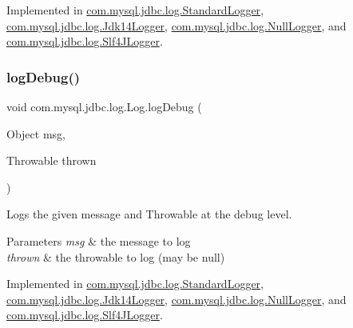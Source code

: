 Implemented in \mbox{\hyperlink{classcom_1_1mysql_1_1jdbc_1_1log_1_1_standard_logger_a3b3bd15eb1f92d224a747ef52620cfdf}{com.\+mysql.\+jdbc.\+log.\+Standard\+Logger}}, \mbox{\hyperlink{classcom_1_1mysql_1_1jdbc_1_1log_1_1_jdk14_logger_a0eacb4fd20d546869f80b5ecd9e8998c}{com.\+mysql.\+jdbc.\+log.\+Jdk14\+Logger}}, \mbox{\hyperlink{classcom_1_1mysql_1_1jdbc_1_1log_1_1_null_logger_a947d1f20badd221aa5aaf15a5944dd56}{com.\+mysql.\+jdbc.\+log.\+Null\+Logger}}, and \mbox{\hyperlink{classcom_1_1mysql_1_1jdbc_1_1log_1_1_slf4_j_logger_a14878bdfd16f163e96847e3d54a4fa5a}{com.\+mysql.\+jdbc.\+log.\+Slf4\+J\+Logger}}.

\mbox{\label{interfacecom_1_1mysql_1_1jdbc_1_1log_1_1_log_ae11c12bcf67d9681ab03e97b9098d28d}} 
\subsubsection{\texorpdfstring{log\+Debug()}{logDebug()}\hspace{0.1cm}{\footnotesize\ttfamily [2/2]}}
{\footnotesize\ttfamily void com.\+mysql.\+jdbc.\+log.\+Log.\+log\+Debug (\begin{DoxyParamCaption}\item[{Object}]{msg,  }\item[{Throwable}]{thrown }\end{DoxyParamCaption})}

Logs the given message and Throwable at the \textquotesingle{}debug\textquotesingle{} level.


\begin{DoxyParams}{Parameters}
{\em msg} & the message to log \\
\hline
{\em thrown} & the throwable to log (may be null) \\
\hline
\end{DoxyParams}


Implemented in \mbox{\hyperlink{classcom_1_1mysql_1_1jdbc_1_1log_1_1_standard_logger_a136dd58baec91623e40b0a7c8d1d1872}{com.\+mysql.\+jdbc.\+log.\+Standard\+Logger}}, \mbox{\hyperlink{classcom_1_1mysql_1_1jdbc_1_1log_1_1_jdk14_logger_a83874be2dc0c2bf71b731e7ef5115a69}{com.\+mysql.\+jdbc.\+log.\+Jdk14\+Logger}}, \mbox{\hyperlink{classcom_1_1mysql_1_1jdbc_1_1log_1_1_null_logger_a2a1e6ac627cdeeb88e0acd8512d42839}{com.\+mysql.\+jdbc.\+log.\+Null\+Logger}}, and \mbox{\hyperlink{classcom_1_1mysql_1_1jdbc_1_1log_1_1_slf4_j_logger_a5a4a9cb3c82f4ba2b8342bd3ae8c56ce}{com.\+mysql.\+jdbc.\+log.\+Slf4\+J\+Logger}}.

